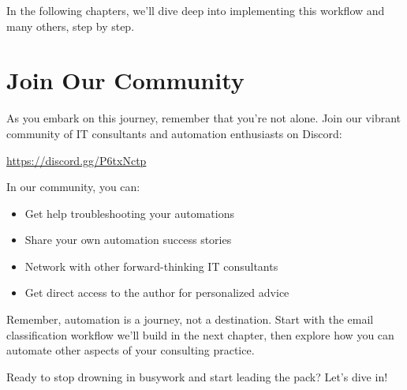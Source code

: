 In the following chapters, we'll dive deep into implementing this workflow and many others, step by step.

\section{Join Our Community}

As you embark on this journey, remember that you're not alone. Join our vibrant community of IT consultants and automation enthusiasts on Discord:

\begin{tcolorbox}[colback=secondarylight,colframe=secondarydark,title=Business Automators Community]
    \begin{center}
    \large\url{https://discord.gg/P6txNctp}
    \end{center}

    In our community, you can:
    \begin{itemize}
        \item Get help troubleshooting your automations
        \item Share your own automation success stories
        \item Network with other forward-thinking IT consultants
        \item Get direct access to the author for personalized advice
    \end{itemize}
\end{tcolorbox}

\begin{importantbox}
Remember, automation is a journey, not a destination. Start with the email classification workflow we'll build in the next chapter, then explore how you can automate other aspects of your consulting practice.
\end{importantbox}

Ready to stop drowning in busywork and start leading the pack? Let's dive in!

